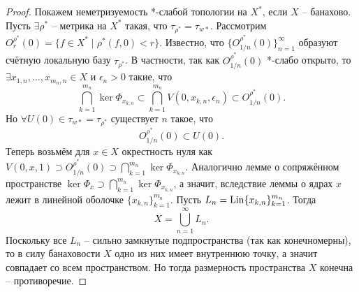 \begin{proof}
    Покажем неметризуемость *-слабой топологии на $X^*$, если $X$ -- банахово.
    Пусть $\exists \rho^*$ -- метрика на $X^*$ такая, что $\tau_{\rho^*} = \tau_{w*}$.
    Рассмотрим $O_r^{\rho^*}(0) = \{f \in X^* \mid \rho^*(f, 0) < r\}$.
    Известно, что $\{O_{1/n}^{\rho^*}(0)\}_{n = 1}^{\infty}$ образуют счётную локальную базу $\tau_{\rho^*}$.
    В частности, так как $O_{1/n}^{\rho^*}(0)$ *-слабо открыто, то $\exists x_{1, n}, \ldots, x_{m_n, n} \in X$ и $\epsilon_n > 0$ такие, что
    \[
        \bigcap_{k = 1}^{m_n} \ker \Phi_{x_{k, n}} \subset \bigcap_{k = 1}^{m_n} V(0, x_{k, n}, \epsilon_n) \subset O^{\rho^*}_{1/n}(0).
    \]
    Но $\forall U(0) \in \tau_{w*} = \tau_{\rho^*}$ существует $n$ такое, что
    \[
        O_{1/n}^{\rho^*}(0) \subset U(0).
    \]
    Теперь возьмём для $x \in X$ окрестность нуля как $V(0, x, 1) \supset O_{1/n}^{\rho^*}(0) \supset \bigcap_{k = 1}^{m_n} \ker \Phi_{x_{k, n}}$.
    Аналогично лемме о сопряжённом пространстве $\ker \Phi_x \supset \bigcap_{k = 1}^{m_n} \ker \Phi_{x_{k, n}}$, а значит, вследствие леммы о ядрах $x$ лежит в линейной оболочке $\{x_{k, n}\}_{k = 1}^{m_n}$.
    Пусть $L_n = \operatorname{Lin}\{x_{k, n}\}_{k = 1}^{m_n}$.
    Тогда
    \[
        X = \bigcup_{n = 1}^{\infty} L_n.
    \]
    Поскольку все $L_n$ -- сильно замкнутые подпространства (так как конечномерны), то в силу банаховости $X$ одно из них имеет внутреннюю точку, а значит совпадает со всем пространством.
    Но тогда размерность пространства $X$ конечна -- противоречие.
\end{proof}